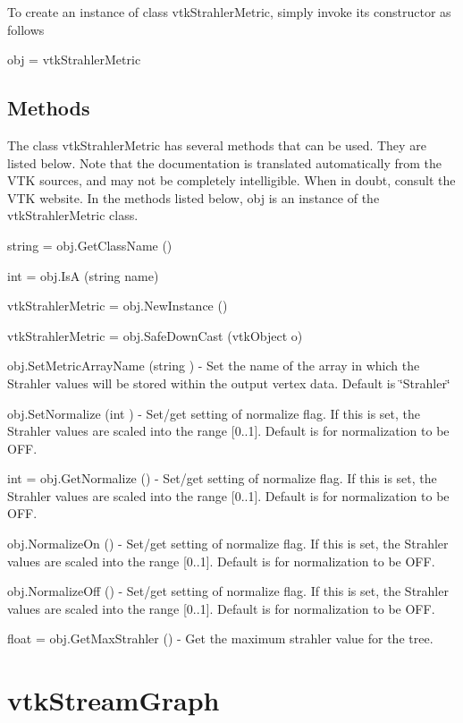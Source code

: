 To create an instance of class vtk\-Strahler\-Metric, simply invoke its constructor as follows \begin{DoxyVerb}  obj = vtkStrahlerMetric
\end{DoxyVerb}
 \hypertarget{vtkwidgets_vtkxyplotwidget_Methods}{}\subsection{Methods}\label{vtkwidgets_vtkxyplotwidget_Methods}
The class vtk\-Strahler\-Metric has several methods that can be used. They are listed below. Note that the documentation is translated automatically from the V\-T\-K sources, and may not be completely intelligible. When in doubt, consult the V\-T\-K website. In the methods listed below, {\ttfamily obj} is an instance of the vtk\-Strahler\-Metric class. 
\begin{DoxyItemize}
\item {\ttfamily string = obj.\-Get\-Class\-Name ()}  
\item {\ttfamily int = obj.\-Is\-A (string name)}  
\item {\ttfamily vtk\-Strahler\-Metric = obj.\-New\-Instance ()}  
\item {\ttfamily vtk\-Strahler\-Metric = obj.\-Safe\-Down\-Cast (vtk\-Object o)}  
\item {\ttfamily obj.\-Set\-Metric\-Array\-Name (string )} -\/ Set the name of the array in which the Strahler values will be stored within the output vertex data. Default is \char`\"{}\-Strahler\char`\"{}  
\item {\ttfamily obj.\-Set\-Normalize (int )} -\/ Set/get setting of normalize flag. If this is set, the Strahler values are scaled into the range \mbox{[}0..1\mbox{]}. Default is for normalization to be O\-F\-F.  
\item {\ttfamily int = obj.\-Get\-Normalize ()} -\/ Set/get setting of normalize flag. If this is set, the Strahler values are scaled into the range \mbox{[}0..1\mbox{]}. Default is for normalization to be O\-F\-F.  
\item {\ttfamily obj.\-Normalize\-On ()} -\/ Set/get setting of normalize flag. If this is set, the Strahler values are scaled into the range \mbox{[}0..1\mbox{]}. Default is for normalization to be O\-F\-F.  
\item {\ttfamily obj.\-Normalize\-Off ()} -\/ Set/get setting of normalize flag. If this is set, the Strahler values are scaled into the range \mbox{[}0..1\mbox{]}. Default is for normalization to be O\-F\-F.  
\item {\ttfamily float = obj.\-Get\-Max\-Strahler ()} -\/ Get the maximum strahler value for the tree.  
\end{DoxyItemize}\hypertarget{vtkinfovis_vtkstreamgraph}{}\section{vtk\-Stream\-Graph}\label{vtkinfovis_vtkstreamgraph}
